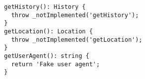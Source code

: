 \begin{verbatim}
  getHistory(): History {
    throw _notImplemented('getHistory');
  }
  getLocation(): Location {
    throw _notImplemented('getLocation');
  }
  getUserAgent(): string {
    return 'Fake user agent';
  }
\end{verbatim}

